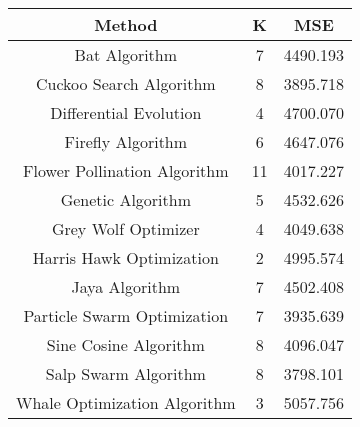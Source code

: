 \documentclass{article}
\begin{document}
\begin{table}
  \centering

	\begin{tabular}{ccc}
	\toprule
	Method & K & MSE \\
	\midrule
	Bat Algorithm & 7 & 4490.193 \\
	Cuckoo Search Algorithm & 8 & 3895.718 \\
	Differential Evolution & 4 & 4700.070 \\
	Firefly Algorithm & 6 & 4647.076 \\
	Flower Pollination Algorithm & 11 & 4017.227 \\
	Genetic Algorithm & 5 & 4532.626 \\
	Grey Wolf Optimizer & 4 & 4049.638 \\
	Harris Hawk Optimization & 2 & 4995.574 \\
	Jaya Algorithm & 7 & 4502.408 \\
	Particle Swarm Optimization & 7 & 3935.639 \\
	Sine Cosine Algorithm & 8 & 4096.047 \\
	Salp Swarm Algorithm & 8 & 3798.101 \\
	Whale Optimization Algorithm & 3 & 5057.756 \\
	\bottomrule
	\end{tabular}

\end{table}
\end{document}
